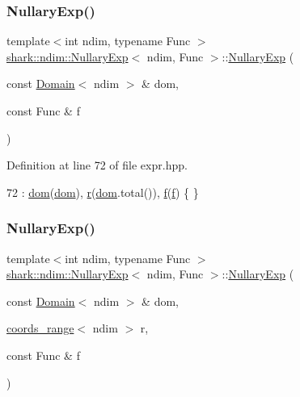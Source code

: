 \subsubsection{\texorpdfstring{Nullary\+Exp()}{NullaryExp()}\hspace{0.1cm}{\footnotesize\ttfamily [1/2]}}
{\footnotesize\ttfamily template$<$int ndim, typename Func $>$ \\
\hyperlink{classshark_1_1ndim_1_1_nullary_exp}{shark\+::ndim\+::\+Nullary\+Exp}$<$ ndim, Func $>$\+::\hyperlink{classshark_1_1ndim_1_1_nullary_exp}{Nullary\+Exp} (\begin{DoxyParamCaption}\item[{const \hyperlink{classshark_1_1ndim_1_1_domain}{Domain}$<$ ndim $>$ \&}]{dom,  }\item[{const Func \&}]{f }\end{DoxyParamCaption})}



Definition at line 72 of file expr.\+hpp.


\begin{DoxyCode}
72 : \hyperlink{classshark_1_1ndim_1_1_nullary_exp_a4af666c034e0035ca4a9c4f8cf2f2ea2}{dom}(\hyperlink{classshark_1_1ndim_1_1_nullary_exp_a4af666c034e0035ca4a9c4f8cf2f2ea2}{dom}), \hyperlink{classshark_1_1ndim_1_1_nullary_exp_a2ab3c895de1618318f8864c90cd7b21e}{r}(\hyperlink{classshark_1_1ndim_1_1_nullary_exp_a4af666c034e0035ca4a9c4f8cf2f2ea2}{dom}.total()), \hyperlink{classshark_1_1ndim_1_1_nullary_exp_a30f367c05cd7978aedec0a99ca82ed0e}{f}(\hyperlink{classshark_1_1ndim_1_1_nullary_exp_a30f367c05cd7978aedec0a99ca82ed0e}{f}) \{ \}
\end{DoxyCode}
\hypertarget{classshark_1_1ndim_1_1_nullary_exp_afb64b1b8dff8c3904b25b6d95125fc71}{}\label{classshark_1_1ndim_1_1_nullary_exp_afb64b1b8dff8c3904b25b6d95125fc71} 
\subsubsection{\texorpdfstring{Nullary\+Exp()}{NullaryExp()}\hspace{0.1cm}{\footnotesize\ttfamily [2/2]}}
{\footnotesize\ttfamily template$<$int ndim, typename Func $>$ \\
\hyperlink{classshark_1_1ndim_1_1_nullary_exp}{shark\+::ndim\+::\+Nullary\+Exp}$<$ ndim, Func $>$\+::\hyperlink{classshark_1_1ndim_1_1_nullary_exp}{Nullary\+Exp} (\begin{DoxyParamCaption}\item[{const \hyperlink{classshark_1_1ndim_1_1_domain}{Domain}$<$ ndim $>$ \&}]{dom,  }\item[{\hyperlink{structshark_1_1ndim_1_1coords__range}{coords\+\_\+range}$<$ ndim $>$}]{r,  }\item[{const Func \&}]{f }\end{DoxyParamCaption})}



